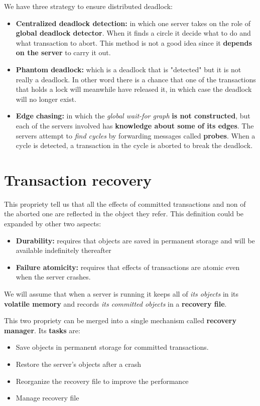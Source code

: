 We have three strategy to ensure distributed deadlock:
\begin{itemize}
    \item \textbf{Centralized deadlock detection:} in which one server takes on the role of \textbf{global deadlock detector}. When it finds a circle it decide what to do and what transaction to abort. This method is not a good idea since it \textbf{depends on the server} to carry it out.
    \item \textbf{Phantom deadlock:} which is a deadlock that is "detected" but it is not really a deadlock. In other word there is a chance that one of the transactions that holds a lock will meanwhile have released it, in which case the deadlock will no longer exist.
    \item \textbf{Edge chasing:} in which the \textit{global wait-for graph} \textbf{is not constructed}, but each of the servers involved has \textbf{knowledge about some of its edges}. The servers attempt to \textit{find cycles} by forwarding messages called \textbf{probes}. When a cycle is detected, a transaction in the cycle is aborted to break the deadlock.
\end{itemize}

\section{Transaction recovery}
This propriety tell us that all the effects of committed transactions and non of the aborted one are reflected in the object they refer. This definition could be expanded by other two aspects:
\begin{itemize}
    \item \textbf{Durability:} requires that objects are saved in permanent storage and will be available indefinitely thereafter
    \item \textbf{Failure atomicity:} requires that effects of transactions are atomic even when the server crashes.
\end{itemize}
We will assume that when a server is running it keeps all of \textit{its objects} in its \textbf{volatile memory} and records \textit{its committed objects} in a \textbf{recovery file}.

This two propriety can be merged into a single mechanism called \textbf{recovery manager}. Its \textbf{tasks} are:
\begin{itemize}
    \item Save objects in permanent storage for committed transactions.
    \item Restore the server’s objects after a crash
    \item Reorganize the recovery file to improve the performance
    \item Manage recovery file
\end{itemize}

